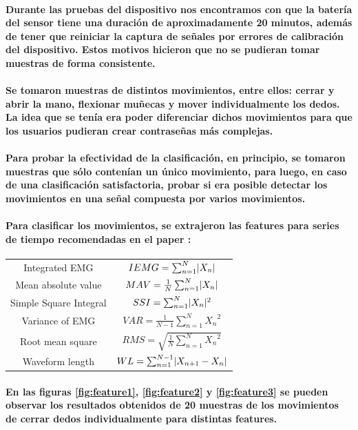 \documentclass{article}
\DeclarePairedDelimiter\abs{\lvert}{\rvert}%
\begin{document}
\paragraph{
Durante las pruebas del dispositivo nos encontramos con que la batería del sensor tiene una duración de aproximadamente 20 minutos, además de tener que reiniciar la captura de señales por errores de calibración del dispositivo. Estos motivos hicieron que no se pudieran tomar muestras de forma consistente.
}
\paragraph{
Se tomaron muestras de distintos movimientos, entre ellos: cerrar y abrir la mano, flexionar muñecas y mover individualmente los dedos. La idea que se tenía era poder diferenciar dichos movimientos para que los usuarios pudieran crear contraseñas más complejas.
}
\paragraph{
Para probar la efectividad de la clasificación, en principio, se tomaron muestras que sólo contenían un único movimiento, para luego, en caso de una clasificación satisfactoria, probar si era posible detectar los movimientos en una señal compuesta por varios movimientos.
}
\paragraph{
Para clasificar los movimientos, se extrajeron las features para series de tiempo recomendadas en el paper \cite{angkoon2009}:
}

\begin{center}
\begin{tabular}{ c c }
 Integrated EMG & $IEMG = \sum_{n=1}^{N} \abs{X_n}$ \\
 Mean absolute value & $MAV = \frac{1}{N} \sum_{n=1}^{N} \abs{X_n}$ \\
 Simple Square Integral & $SSI = \sum_{n=1}^{N}\abs{X_n}^2$ \\
 Variance of EMG & $VAR = \frac{1}{N-1} \sum_{n=1}^{N} {X_n}^2$ \\
 Root mean square & $RMS = \sqrt{\frac{1}{N} \sum_{n=1}^{N} {X_n}^2}$ \\
 Waveform length & $WL = \sum_{n=1}^{N-1} \abs{X_{n + 1} - X_n}$
\end{tabular}
\end{center}

\paragraph{
En las figuras \ref{fig:feature1}, \ref{fig:feature2} y \ref{fig:feature3} se pueden observar los resultados obtenidos de 20 muestras de los movimientos de cerrar dedos individualmente para distintas features.
}
\end{document}
